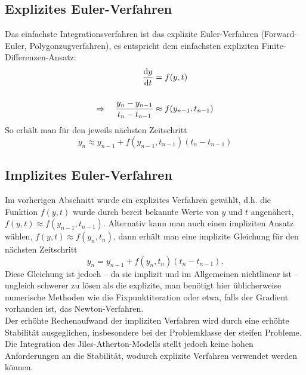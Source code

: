 \documentclass{scrartcl}
\begin{document}
\subsection{Explizites Euler-Verfahren}
Das einfachste Integrationsverfahren ist das explizite Euler-Verfahren (Forward-Euler, Polygonzugverfahren), es entspricht dem einfachsten expliziten Finite-Differenzen-Ansatz:
\begin{equation}
\begin{aligned}
	\frac{\mathop{}\!\mathrm{d} y}{\mathop{}\!\mathrm{d} t} &= f(y, t)\\[0.5cm]
	\Rightarrow	\quad \frac{y_{n} - y_{n-1}}{t_{n} - t_{n-1}} &\approx f(y_{n-1}, t_{n-1})
\end{aligned}
\end{equation}
So erhält man für den jeweils nächsten Zeitschritt
\begin{equation}
	y_n \approx y_{n-1} + f(y_{n-1}, t_{n-1})(t_n - t_{n-1})
\end{equation}
\subsection{Implizites Euler-Verfahren}
Im vorherigen Abschnitt wurde ein explizites Verfahren gewählt, d.h. die Funktion $f(y,t)$ wurde durch bereit bekannte Werte von $y$ und $t$ angenähert, $f(y, t) \approx f(y_{n-1}, t_{n-1})$. Alternativ kann man auch einen impliziten Ansatz wählen, $f(y, t) \approx f(y_n, t_n)$, dann erhält man eine implizite Gleichung für den nächsten Zeitschritt
\begin{equation}
	y_n = y_{n-1} + f(y_n, t_n)(t_n - t_{n-1}).
\end{equation}
Diese Gleichung ist jedoch -- da sie implizit und im Allgemeinen nichtlinear ist -- ungleich schwerer zu lösen als die explizite, man benötigt hier üblicherweise numerische Methoden wie die Fixpunktiteration oder etwa, falls der Gradient vorhanden ist, das Newton-Verfahren.\\
Der erhöhte Rechenaufwand der impliziten Verfahren wird durch eine erhöhte Stabilität ausgeglichen, insbesondere bei der Problemklasse der steifen Probleme.\\
Die Integration des Jiles-Atherton-Modells stellt jedoch keine hohen Anforderungen an die Stabilität, wodurch explizite Verfahren verwendet werden können.
\end{document}
